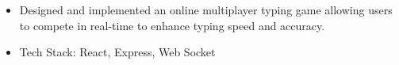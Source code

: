 \documentclass[]{resume}
\begin{document}
\vspace{.6em}
\begin{itemize}
  \item Designed and implemented an online multiplayer typing game allowing users to compete in real-time to enhance typing speed and accuracy.
  \item Tech Stack: React, Express, Web Socket
  
\end{itemize}
\end{document}
